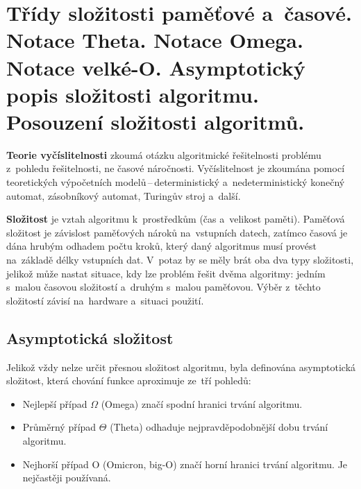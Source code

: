 
\clearpage
\section{Třídy složitosti paměťové a~časové. Notace Theta. Notace Omega. Notace velké-O. Asymptotický popis složitosti algoritmu. Posouzení složitosti algoritmů.}

\textbf{Teorie vyčíslitelnosti} zkoumá otázku algoritmické řešitelnosti problému z~pohledu řešitelnosti, ne časové náročnosti. Vyčíslitelnost je zkoumána pomocí teoretických výpočetních modelů\,--\,deterministický a~nedeterministický konečný automat, zásobníkový automat, Turingův stroj a~další.

\textbf{Složitost} je vztah algoritmu k~prostředkům (čas a~velikost paměti). Paměťová složitost je závislost paměťových nároků na~vstupních datech, zatímco časová je dána hrubým odhadem počtu kroků, který daný algoritmus musí provést na~základě délky vstupních dat. V~potaz by se měly brát oba dva typy složitosti, jelikož může nastat situace, kdy lze problém řešit dvěma algoritmy: jedním s~malou časovou složitostí a~druhým s~malou paměťovou. Výběr z~těchto složitostí závisí na~hardware a~situaci použití.

\subsection{Asymptotická složitost}

Jelikož vždy nelze určit přesnou složitost algoritmu, byla definována asymptotická složitost, která chování funkce aproximuje ze~tří pohledů:

\begin{itemize}
	\item Nejlepší případ \( \Omega \) (Omega) značí spodní hranici trvání algoritmu.
	\item Průměrný případ \( \Theta \) (Theta) odhaduje nejpravděpodobnější dobu trvání algoritmu.
	\item Nejhorší případ O (Omicron, big-O) značí horní hranici trvání algoritmu. Je nejčastěji používaná.
\end{itemize}

